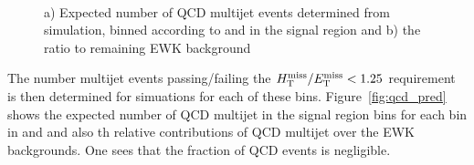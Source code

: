 \begin{figure}[!h]
  \centering
   \\
  \caption{a) Expected number of QCD multijet events determined from
    simulation, binned according to \njet and \scalht in the signal region and b) the ratio to remaining EWK background }
  \label{fig:qcd_plots}
\end{figure}


The number multijet events passing/failing the $\mbox{$\mbox{$H_{\rm T}^{\rm miss}$} / \mbox{$E_\text{T}^{\rm miss}$}$} < 1.25$ requirement is then determined for simuations for each
of these bins. Figure~\ref{fig:qcd_pred} shows the expected number of QCD multijet  in the signal region bins for each bin in \njet and \scalht and also th relative contributions of QCD multijet over the EWK backgrounds. One sees that the fraction of QCD events is negligible.

